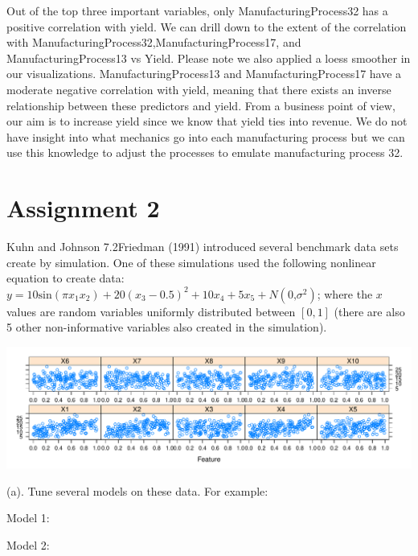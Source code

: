 \documentclass[]{report}
\begin{document}
Out of the top three important variables, only ManufacturingProcess32
has a positive correlation with yield. We can drill down to the extent
of the correlation with ManufacturingProcess32,ManufacturingProcess17,
and ManufacturingProcess13 vs Yield. Please note we also applied a loess
smoother in our visualizations. ManufacturingProcess13 and
ManufacturingProcess17 have a moderate negative correlation with yield,
meaning that there exists an inverse relationship between these
predictors and yield. From a business point of view, our aim is to
increase yield since we know that yield ties into revenue. We do not
have insight into what mechanics go into each manufacturing process but
we can use this knowledge to adjust the processes to emulate
manufacturing process 32.

\hypertarget{AS-2}{%
\chapter*{Assignment 2}\label{AS-2}}


\begin{question}{Kuhn and Johnson 7.2}Friedman (1991) introduced several benchmark data sets create by simulation. One of these simulations used the following nonlinear equation to create data: $y = 10\text{sin}(\pi x_1 x_2)+20(x_3-0.5)^2+10x_4+5x_5+N(0\text{,} \sigma^2)$; where the $x$ values are random variables uniformly distributed between $[0, 1]$ (there are also 5 other non-informative variables also created in the simulation). \end{question}

\includegraphics{Homework-Two_files/figure-latex/kj-7.2-ex1-1.pdf}

\begin{subquestion}{(a).} Tune several models on these data. For example: 
\end{subquestion}

Model 1:

Model 2:
\end{document}
